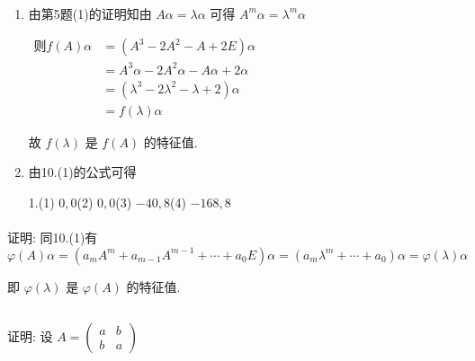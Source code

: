      \paragraph{} %
         \begin{enumerate}
             \item %
                   由第5题(1)的证明知由 \( A\alpha = \lambda\alpha \) 可得 \( A^{m}\alpha = \lambda^{m}\alpha \)

                   \(\begin{aligned}
                       \text{则} f(A)\alpha & = (A^{3} - 2A^{2} - A + 2E)\alpha                  \\
                                           & = A^{3}\alpha - 2A^{2}\alpha - A\alpha + 2\alpha   \\
                                           & = (\lambda^{3} - 2\lambda^{2} - \lambda + 2)\alpha \\
                                           & = f(\lambda)\alpha \quad
                   \end{aligned}\)

                   故 \(f(\lambda)\) 是 \(f(A)\) 的特征值.
             \item %
                   由10.(1)的公式可得

                   1.(1) \( 0, 0 \)\quad(2) \( 0, 0 \)\quad (3) \( -40, 8 \)\quad (4) \( -168, 8 \)

         \end{enumerate}


     \paragraph{} %
         证明: 同10.(1)有 \( \varphi(A)\alpha = (a_{m}A^{m} + a_{m-1}A^{m-1} + \cdots + a_{0}E)\alpha = (a_{m}\lambda^{m} + \cdots + a_{0})\alpha = \varphi(\lambda)\alpha \)

         即 \(\varphi(\lambda)\) 是 \(\varphi(A)\) 的特征值.


 \subsection{} %


     \paragraph{} %
         证明: 设 \( A = \begin{pmatrix}
             a & b \\
             b & a
         \end{pmatrix} \)

